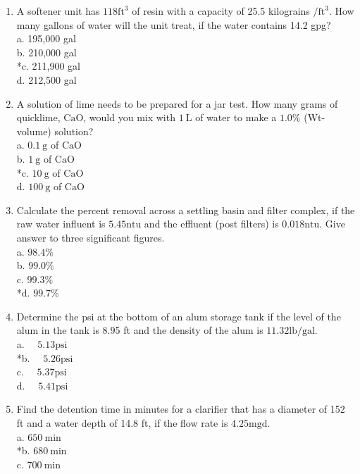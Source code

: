 \begin{enumerate}
  \item A softener unit has $118 \mathrm{ft}^{3}$ of resin with a capacity of 25.5 kilograins $/ \mathrm{ft}^{3}$. How many gallons of water will the unit treat, if the water contains 14.2 gpg?\\
a. 195,000 gal\\
b. 210,000 gal\\
*c. 211,900 gal\\
d. 212,500 gal\\
  \item A solution of lime needs to be prepared for a jar test. How many grams of quicklime, $\mathrm{CaO}$, would you mix with $1 \mathrm{~L}$ of water to make a $1.0 \%$ (Wt-volume) solution?\\
a. $0.1 \mathrm{~g}$ of $\mathrm{CaO}$\\
b. $1 \mathrm{~g}$ of $\mathrm{CaO}$\\
*c. $10 \mathrm{~g}$ of $\mathrm{CaO}$\\
d. $100 \mathrm{~g}$ of $\mathrm{CaO}$\\
  \item Calculate the percent removal across a settling basin and filter complex, if the raw water influent is $5.45 \mathrm{ntu}$ and the effluent (post filters) is $0.018 \mathrm{ntu}$. Give answer to three significant figures.\\
a. $98.4 \%$\\
b. $99.0 \%$\\
c. $99.3 \%$\\
*d. $99.7 \%$\\
  \item Determine the psi at the bottom of an alum storage tank if the level of the alum in the tank is 8.95 ft and the density of the alum is $11.32 \mathrm{lb} / \mathrm{gal}$.\\
a. $\quad 5.13 \mathrm{psi}$\\
*b. $\quad 5.26 \mathrm{psi}$\\
c. $\quad 5.37 \mathrm{psi}$\\
d. $\quad 5.41 \mathrm{psi}$\\
  \item Find the detention time in minutes for a clarifier that has a diameter of 152 ft and a water depth of 14.8 ft, if the flow rate is $4.25 \mathrm{mgd}$.\\
a. $650 \mathrm{~min}$\\
*b. $680 \mathrm{~min}$\\
c. $700 \mathrm{~min}$\\

\end{enumerate}
